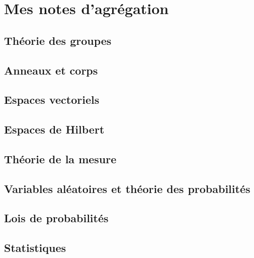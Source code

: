 


\makeindex
\makenomenclature





    
    

\tableofcontents

\part{Mes notes d'agrégation}

\chapter{Théorie des groupes}


\chapter{Anneaux et corps}


\chapter{Espaces vectoriels}


\chapter{Espaces de Hilbert}


\chapter{Théorie de la mesure}


\chapter{Variables aléatoires et théorie des probabilités}


\chapter{Lois de probabilités}


\chapter{Statistiques}



